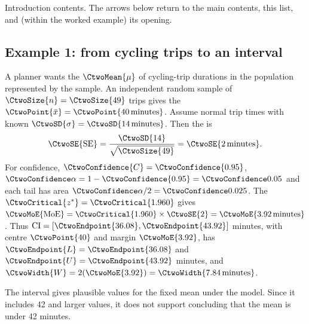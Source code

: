 \label{toc:c2-introduction}
\begingroup
\let\CtwoContentsBold\textbf
\renewcommand{\textbf}[1]{\ifstrequal{#1}{Problems:}{\CtwoContentsBold{Introduction contents:}}{\CtwoContentsBold{#1}}}
\endgroup
\par\vspace{8mm}
\noindent\small Introduction contents. The arrows below return to the main contents,
this list, and (within the worked example) its opening.\normalsize
\par\vspace{3mm}
\clearpage


\noindent\begin{minipage}{\linewidth}
\subsection{Example 1: from cycling trips to an interval}
\label{subsec:c2-cycling-example}
A planner wants the  $\CtwoMean{\mu}$ of cycling-trip durations in the population represented by the sample. An independent random sample of $\CtwoSize{n}=\CtwoSize{49}$ trips gives the  $\CtwoPoint{\bar{x}}=\CtwoPoint{40\,\text{minutes}}$. Assume normal trip times with known  $\CtwoSD{\sigma}=\CtwoSD{14\,\text{minutes}}$. Then the  is
\[
\CtwoSE{\mathrm{SE}}=\frac{\CtwoSD{14}}{\sqrt{\CtwoSize{49}}}=\CtwoSE{2\,\text{minutes}}.
\]
For  confidence, $\CtwoConfidence{C}=\CtwoConfidence{0.95}$, $\CtwoSignificance{\alpha}=1-\CtwoConfidence{0.95}=\CtwoSignificance{0.05}$ and each tail has area $\CtwoSignificance{\alpha}/2=\CtwoSignificance{0.025}$. The  $\CtwoCritical{z^*}=\CtwoCritical{1.960}$ gives  $\CtwoMoE{\mathrm{MoE}}=\CtwoCritical{1.960}\times\CtwoSE{2}=\CtwoMoE{3.92\,\text{minutes}}$. Thus $\mathrm{CI}=[\CtwoEndpoint{36.08},\CtwoEndpoint{43.92}]$ minutes, with centre $\CtwoPoint{40}$ and margin $\CtwoMoE{3.92}$, has  $\CtwoEndpoint{L}=\CtwoEndpoint{36.08}$ and $\CtwoEndpoint{U}=\CtwoEndpoint{43.92}$ minutes, and  $\CtwoWidth{W}=2(\CtwoMoE{3.92})=\CtwoWidth{7.84\,\text{minutes}}$.

The interval gives plausible values for the fixed mean under the model. Since it includes 42 and larger values, it does not support concluding that the mean is under 42 minutes.
\par\vspace{3mm}
\end{minipage}\par

